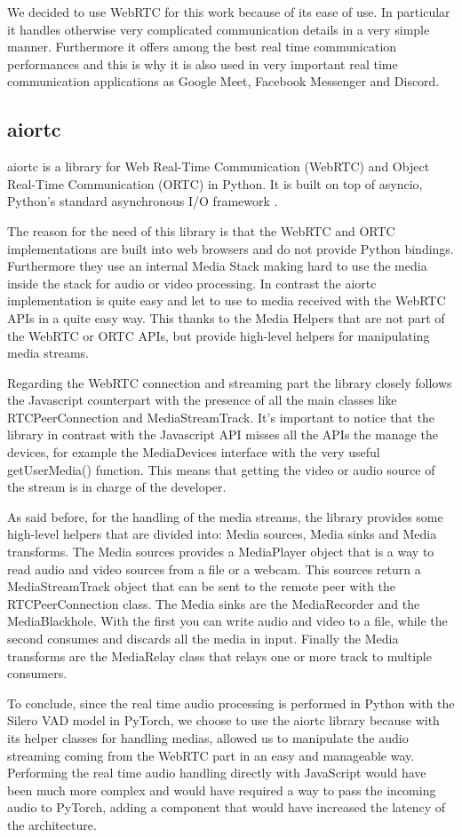 \documentclass[../main.tex]{subfiles}
\begin{document}
We decided to use WebRTC for this work because of its ease of use. In particular it handles otherwise very complicated communication details in a very simple manner. Furthermore it offers among the best real time communication performances and this is why it is also used in very important real time communication applications as Google Meet, Facebook Messenger and Discord.

\subsection{aiortc}

aiortc is a library for Web Real-Time Communication (WebRTC) and Object Real-Time Communication (ORTC) in Python. It is built on top of asyncio, Python's standard asynchronous I/O framework \cite{aiortc}.

The reason for the need of this library is that the WebRTC and ORTC implementations are built into web browsers and do not provide Python bindings. Furthermore they use an internal Media Stack making hard to use the media inside the stack for audio or video processing. In contrast the aiortc implementation is quite easy and let to use to media received with the WebRTC APIs in a quite easy way. This thanks to the Media Helpers that are not part of the WebRTC or ORTC APIs, but provide high-level helpers for manipulating media streams.  

Regarding the WebRTC connection and streaming part the library closely follows the Javascript counterpart with the presence of all the main classes like RTCPeerConnection and MediaStreamTrack. It's important to notice that the library in contrast with the Javascript API misses all the APIs the manage the devices, for example the MediaDevices interface with the very useful getUserMedia() function. This means that getting the video or audio source of the stream is in charge of the developer. 

As said before, for the handling of the media streams, the library provides some high-level helpers that are divided into: Media sources, Media sinks and Media transforms. The Media sources provides a MediaPlayer object that is a way to read audio and video sources from a file or a webcam. This sources return a MediaStreamTrack object that can be sent to the remote peer with the RTCPeerConnection class. The Media sinks are the MediaRecorder and the MediaBlackhole. With the first you can write audio and video to a file, while the second consumes and discards all the media in input. Finally the Media transforms are the MediaRelay class that relays one or more track to multiple consumers. 

To conclude, since the real time audio processing is performed in Python with the Silero VAD model in PyTorch, we choose to use the aiortc library because with its helper classes for handling medias, allowed us to manipulate the audio streaming coming from the WebRTC part in an easy and manageable way. Performing the real time audio handling directly with JavaScript would have been much more complex and would have required a way to pass the incoming audio to PyTorch, adding a component that would have increased the latency of the architecture. 
\end{document}
